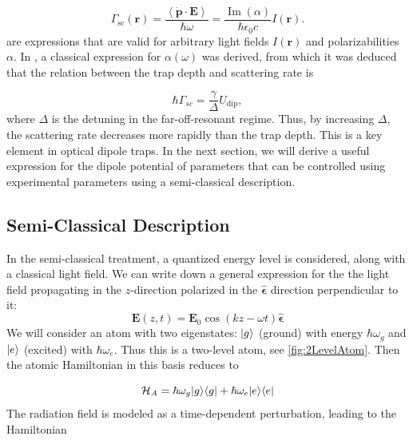 \begin{equation}\label{eq:ScatteringRate}
	\Gamma_{\text{sc}}(\mathbf{r}) = \frac{\left\langle \dot{\mathbf{p}} \cdot \mathbf{E} \right\rangle}{\hbar \omega}
	 = \frac{\operatorname{Im}(\alpha)}{\hbar \epsilon_0 c} I(\mathbf{r}).
\end{equation}
 are expressions that are valid for arbitrary light fields $I(\mathbf{r})$ and polarizabilities $\alpha$.
In \cite{Grimm2000}, a classical expression for $\alpha(\omega)$ was derived, from which it was deduced that the relation between the trap depth and scattering rate is

\begin{equation}\label{eq:RelationUG}
    \hbar \Gamma_{sc} =\frac{\gamma}{\Delta} U_{\text{dip}},
\end{equation}
where $\Delta$ is the detuning in the far-off-resonant regime. 
Thus, by increasing $\Delta$, the scattering rate decreases more rapidly than the trap depth. 
This is a key element in optical dipole traps. 
In the next section, we will derive a useful expression for the dipole potential of parameters that can be controlled using experimental parameters using a semi-classical description.

\subsection{Semi-Classical Description}

In the semi-classical treatment, a quantized energy level is considered, along with a classical light field. 
We can write down a general expression for the the light field propagating in the $z$-direction polarized in the $\bm{\hat{\epsilon}}$ direction perpendicular to it:
\begin{equation}\label{eq:ClassicalField}
	\mathbf{E}(z,t) = \mathbf{E}_0 \cos{(k z - \omega t)} 	\bm{\hat{\epsilon}}
\end{equation}
We will consider an atom with two eigenstates: $\lvert g\rangle$ (ground) with energy $\hbar \omega_g$ and $\lvert e\rangle$ (excited) with $\hbar \omega_e$.
Thus this is a two-level atom, see \cref{fig:2LevelAtom}. 
Then the atomic Hamiltonian in this basis reduces to \cite{Loudon2000}


\begin{equation}\label{eq:AtomHamiltonianMain}
	\mathcal{H}_A = \hbar \omega_g \lvert g\rangle\langle g\rvert + \hbar \omega_e \lvert e\rangle\langle e\rvert
\end{equation}
The radiation field is modeled as a time-dependent perturbation, leading to the Hamiltonian \cite{Leeuwen2017}

